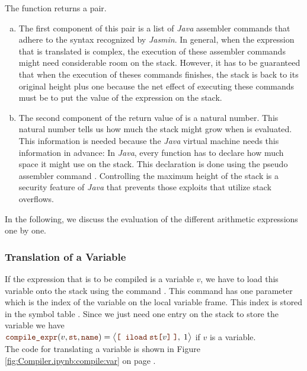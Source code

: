 The function  returns a pair.  
\begin{enumerate}[(a)]
\item The first component of this pair is a list of \textsl{Java} 
      assembler commands that adhere to the syntax recognized by \textsl{Jasmin}.  In general, when the
      expression that is translated is complex, the execution of these assembler commands might need
      considerable room on the stack.  However, it has to be guaranteed that when the execution of theses
      commands finishes, the stack is back to its original height plus one because the net 
      effect of executing these commands must be to put the value of the expression on the stack.
\item The second component of the return value of  is a natural number.
      This natural number tells us how much the stack might grow when  is evaluated.
      This information is needed because the \textsl{Java} virtual machine needs this information in advance:
      In \textsl{Java}, every function has to declare how much space it might use on the stack.
      This declaration is done using the pseudo assembler command .  Controlling the 
      maximum height of the stack is a security feature of \textsl{Java} that prevents those exploits that
      utilize stack overflows.
\end{enumerate}
In the following, we discuss the evaluation of the different arithmetic expressions one by one.


\subsubsection{Translation of a Variable}
If the expression that is to be compiled is a variable $v$, we have to load this variable onto the stack using
the command .  This command has one parameter which is the index of the variable on the local
variable frame.  This index is stored in the symbol table .  Since we just need one entry on the
stack to store the variable we have
\\[0.2cm]
\hspace*{1.3cm}
$\mytt{compile\_expr}(v, \mytt{st}, \mytt{name}) = 
 \bigl\langle\mytt{[}\;\; \mytt{iload}\; \mytt{st[}v\mytt{]}\; \mytt{]}, \; 1\bigr\rangle$ \quad
 if $v$ is a variable.
\\[0.2cm]
The code for translating a variable is shown in Figure \ref{fig:Compiler.ipynb:compile:var} on page
\pageref{fig:Compiler.ipynb:compile:var}.


